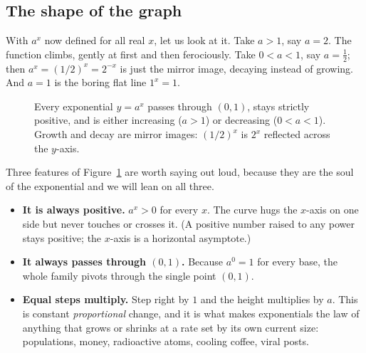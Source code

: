 \subsection{The shape of the graph}

With $a^x$ now defined for all real $x$, let us look at it. Take $a>1$, say $a=2$. The function climbs, gently at first and then ferociously. Take $0<a<1$, say $a=\tfrac12$; then $a^x = (1/2)^x = 2^{-x}$ is just the mirror image, decaying instead of growing. And $a=1$ is the boring flat line $1^x=1$.

\begin{figure}[H]
\centering
{}
\caption{Every exponential $y=a^x$ passes through $(0,1)$, stays strictly positive, and is either increasing ($a>1$) or decreasing ($0<a<1$). Growth and decay are mirror images: $(1/2)^x$ is $2^x$ reflected across the $y$-axis.}
\label{ch03:fig-exp-family}
\end{figure}

Three features of Figure~\ref{ch03:fig-exp-family} are worth saying out loud, because they are the soul of the exponential and we will lean on all three.

\begin{itemize}
\item \textbf{It is always positive.} $a^x>0$ for every $x$. The curve hugs the $x$-axis on one side but never touches or crosses it. (A positive number raised to any power stays positive; the $x$-axis is a horizontal asymptote.)
\item \textbf{It always passes through $(0,1)$.} Because $a^0=1$ for every base, the whole family pivots through the single point $(0,1)$.
\item \textbf{Equal steps multiply.} Step right by $1$ and the height multiplies by $a$. This is constant \emph{proportional} change, and it is what makes exponentials the law of anything that grows or shrinks at a rate set by its own current size: populations, money, radioactive atoms, cooling coffee, viral posts.
\end{itemize}

